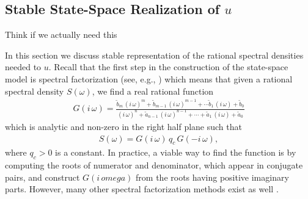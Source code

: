 \documentclass[journal]{IEEEtran}
\newcommand{\simo}[1]{{\color{red}#1}}
\begin{document}
\subsection{Stable State-Space Realization of $u$}
%
\simo{Think if we actually need this}

In this section we discuss stable representation of the rational spectral densities needed to $u$. Recall that the first step in the construction of the state-space model is spectral factorization (see, e.g., \cite{Hartikainen+Sarkka:2010, Sarkka+Hartikainen:2012, Sarkka+Solin+Hartikainen:2013}) which means that given a rational spectral density $S(\omega)$, we find a real rational function
%
\begin{equation}
\begin{split}
 G(i \, \omega)
 = \frac{\tilde{b}_m \, (i \, \omega)^m + \tilde{b}_{m-1} \, (i \, \omega)^{m-1} + \cdots
   \tilde{b}_1 \, (i \, \omega) + \tilde{b}_0}
   {(i \, \omega)^n + \tilde{a}_{n-1} \, (i \, \omega)^{n-1} + \cdots + \tilde{a}_1 \, (i \, \omega) + \tilde{a}_0}
\end{split}
\label{eq:trans2}
\end{equation}
%
which is analytic and non-zero in the right half plane such that
%
\begin{equation}
\begin{split}
  S(\omega) = G(i \, \omega) \, q_c \, G(-i \, \omega),
\end{split}
\end{equation}
%
where $q_c > 0$ is a constant. In practice, a viable way to find the function is by computing the roots of numerator and denominator, which appear in conjugate pairs, and construct $G(i \, omega)$ from the roots having positive imaginary parts. However, many other spectral factorization methods exist as well \cite{Ref-to-spec-fact-survey}.
\end{document}
